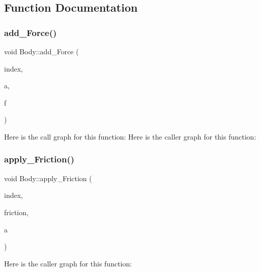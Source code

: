 \subsection{Function Documentation}
\mbox{\label{namespace_body_af3ba929a43f9efd909bb113b39740a84}} 
\subsubsection{\texorpdfstring{add\+\_\+\+Force()}{add\_Force()}}
{\footnotesize\ttfamily void Body\+::add\+\_\+\+Force (\begin{DoxyParamCaption}\item[{int}]{index,  }\item[{\mbox{\hyperlink{struct_body_1_1_factory}{Factory}} $\ast$}]{a,  }\item[{const \mbox{\hyperlink{struct_vec2_d_1_1_vec2_d}{Vec2\+D\+::\+Vec2D}} $\ast$}]{f }\end{DoxyParamCaption})}

Here is the call graph for this function\+:
Here is the caller graph for this function\+:
\mbox{\label{namespace_body_aad381674a5614ab2d8801dd3d9d718ea}} 
\subsubsection{\texorpdfstring{apply\+\_\+\+Friction()}{apply\_Friction()}}
{\footnotesize\ttfamily void Body\+::apply\+\_\+\+Friction (\begin{DoxyParamCaption}\item[{int}]{index,  }\item[{const \mbox{\hyperlink{struct_vec2_d_1_1_vec2_d}{Vec2\+D\+::\+Vec2D}} $\ast$}]{friction,  }\item[{\mbox{\hyperlink{struct_body_1_1_factory}{Factory}} $\ast$}]{a }\end{DoxyParamCaption})}

Here is the caller graph for this function\+:
\mbox{\label{namespace_body_a58172e4bc16d9c5117b5625f6918132c}} 
